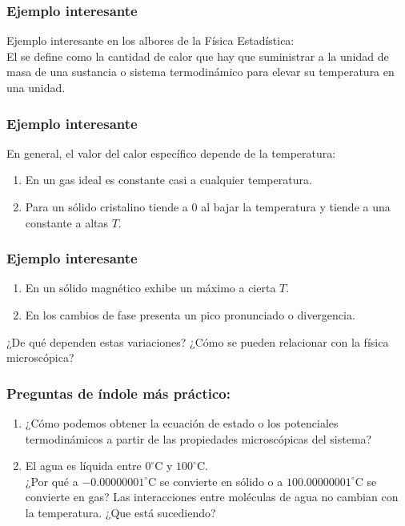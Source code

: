 \documentclass[12pt]{beamer}
\begin{document}
\begin{frame}
\frametitle{Ejemplo interesante}
Ejemplo interesante en los albores de la Física Estadística:
\\
\bigskip
\pause
El  se define como la cantidad de calor que hay que suministrar a la unidad de masa de una sustancia o sistema termodinámico para elevar su temperatura en una unidad.
\end{frame}
\begin{frame}
\frametitle{Ejemplo interesante}
En general, el valor del calor específico depende de la temperatura:
\pause
{}
\begin{enumerate}[<+->]
\item En un gas ideal es constante casi a cualquier temperatura.
\item Para un sólido cristalino tiende a $0$ al bajar la temperatura y tiende a una constante a altas $T$.
\seti
\end{enumerate}
\end{frame}
\begin{frame}
\frametitle{Ejemplo interesante}
\begin{enumerate}[<+->]
\conti
\item En un sólido magnético exhibe un máximo a cierta $T$.
\item En los cambios de fase presenta un pico pronunciado o divergencia.
\end{enumerate}
\pause
¿De qué dependen estas variaciones? \pause ¿Cómo se pueden relacionar con la física microscópica?
\end{frame}
\begin{frame}
\frametitle{Preguntas de índole más práctico:}
\begin{enumerate}[<+->]
\item ¿Cómo podemos obtener la ecuación de estado o los potenciales termodinámicos a partir de las propiedades microscópicas del sistema?
\item El agua es líquida entre $0^{\circ} \text{C}$ y $100^{\circ} \text{C}$.
\\ \pause
¿Por qué a $-0.00000001^{\circ} \text{C}$ se convierte en sólido \pause o a $100.00000001^{\circ} \text{C}$ se convierte en gas? \pause Las interacciones entre moléculas de agua no cambian con la temperatura. \pause ¿Que está sucediendo?
\seti
\end{enumerate}
\end{frame}
\end{document}
